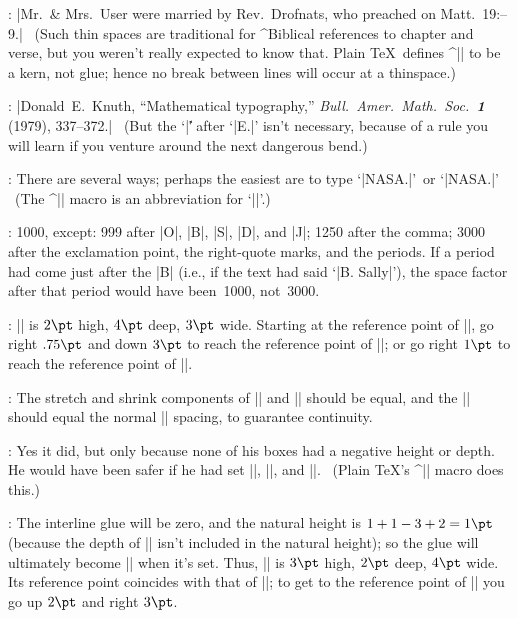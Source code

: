 {{{:
 |Mr.~\& Mrs.~User
were married by Rev.~Drofnats, who preached on
Matt.~19\thinspace:--9.| \ (Such thin spaces are traditional
for ^{Biblical references} to chapter and verse, but you weren't really
expected to know that. Plain \TeX\ defines ^|\thinspace| to be a kern,
not glue; hence no break between lines will occur at a thinspace.)

:
 |Donald~E.\ Knuth, ``Mathematical typography,'' {\sl Bull.\
Amer.\ Math.\ Soc.\ \bf1} (1979), 337--372.| \ (But the `|\|' after `|E.|'
isn't necessary, because of a rule you will learn if you venture
around the next dangerous bend.)

:
 There are several ways; perhaps the easiest are to type
`|\hbox{NASA}.|'\ or `|NASA\null.|' \ (The ^|\null| macro is an abbreviation
for `|\hbox{}|'.)

:
 1000, except: 999 after |O|, |B|, |S|, |D|, and |J|; 1250 after the
comma; 3000 after the exclamation point, the right-quote marks, and the
periods. If a period had come just after the |B| (i.e., if the text had
said `|B. Sally|'), the space factor after that period would have
been~1000, not~3000.

:
 || is $2\pt$ high, $4\pt$ deep, $3\pt$ wide.
Starting at the reference point of\/ |\box3|, go right $.75\pt$ and down
$3\pt$ to reach the reference point of\/ |\box1|; or go right $1\pt$
to reach the reference point of\/ |\box2|.

:
 The stretch and shrink components of\/ |\baselineskip| and
|\lineskip| should be equal, and the |\lineskiplimit| should
equal the normal |\lineskip| spacing, to guarantee continuity.

:
 Yes it did, but only because none of his boxes had a negative
height or depth. He would have been safer if he had set
|\baselineskip=-1000pt|, |\lineskip=0pt|, and
|\lineskiplimit=16383pt|. \ (Plain \TeX's ^|\offinterlineskip| macro does this.)

:
 The interline glue will be zero, and the natural height is
$1+1-3+2=1\pt$ (because the depth of\/ || isn't included in the natural
height); so the glue will ultimately become |\vskip-1pt| when it's set.
Thus, |\box3| is $3\pt$ high, $2\pt$ deep, $4\pt$ wide. Its reference
point coincides with that of\/ |\box2|; to get to the reference point
of\/ |\box1| you go up $2\pt$ and right $3\pt$.

}}}
